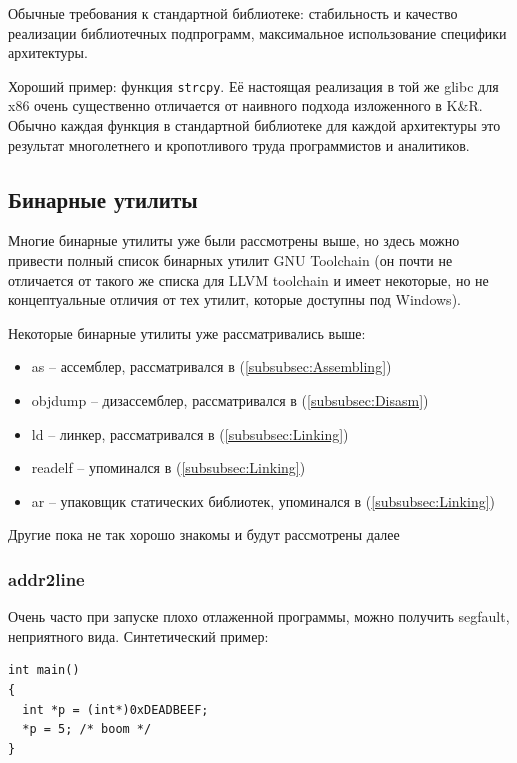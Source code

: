 \documentclass[a4paper,12pt,oneside]{article}
\begin{document}
Обычные требования к стандартной библиотеке: стабильность и качество реализации библиотечных подпрограмм, максимальное использование специфики архитектуры.

Хороший пример: функция \lstinline!strcpy!. Её настоящая реализация в той же glibc для x86 очень существенно отличается от наивного подхода изложенного в K\&R. Обычно каждая функция в стандартной библиотеке для каждой архитектуры это результат многолетнего и кропотливого труда программистов и аналитиков.

\pagebreak
\subsection{Бинарные утилиты}\label{subsec:Binutils}

Многие бинарные утилиты уже были рассмотрены выше, но здесь можно привести полный список бинарных утилит GNU Toolchain (он почти не отличается от такого же списка для LLVM toolchain и имеет некоторые, но не концептуальные отличия от тех утилит, которые доступны под Windows).

Некоторые бинарные утилиты уже рассматривались выше:

\begin{itemize}
\item as -- ассемблер, рассматривался в (\ref{subsubsec:Assembling})
\item objdump -- дизассемблер, рассматривался в (\ref{subsubsec:Disasm})
\item ld -- линкер, рассматривался в (\ref{subsubsec:Linking})
\item readelf -- упоминался в (\ref{subsubsec:Linking})
\item ar -- упаковщик статических библиотек, упоминался в (\ref{subsubsec:Linking})
\end{itemize}

Другие пока не так хорошо знакомы и будут рассмотрены далее 

\subsubsection{addr2line}\label{subsubsec:AddrLine}

Очень часто при запуске плохо отлаженной программы, можно получить segfault, неприятного вида. Синтетический пример:

\begin{lstlisting}
int main()
{
  int *p = (int*)0xDEADBEEF;
  *p = 5; /* boom */
}
\end{lstlisting}
\end{document}
